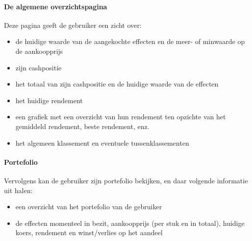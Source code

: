 \paragraph{De algemene overzichtspagina}
Deze pagina geeft de gebruiker een zicht over:
\begin{itemize}
	\item{de huidige waarde van de aangekochte effecten en de meer- of minwaarde op de aankoopprijs}
	\item{zijn cashpositie}
	\item{het totaal van zijn cashpositie en de huidige waarde van de effecten}
	\item{het huidige rendement}
	\item{een grafiek met een overzicht van hun rendement ten opzichte van het gemiddeld rendement, beste rendement, enz.}
	\item{het algemeen klassement en eventuele tussenklassementen}
\end{itemize}

\paragraph{Portefolio}
Vervolgens kan de gebruiker zijn portefolio bekijken, en daar volgende informatie uit halen:
\begin{itemize}
	\item{een overzicht van het portefolio van de gebruiker}
	\item{de effecten momenteel in bezit, aankoopprijs (per stuk en in totaal), huidige koers, rendement en winst/verlies op het aandeel}
\end{itemize}

